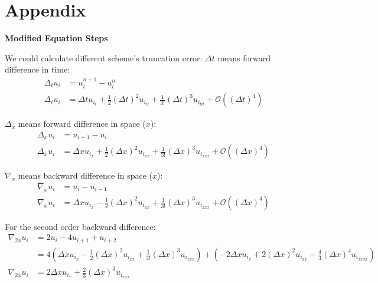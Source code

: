 \documentclass[12pt]{article}
\begin{document}
\newpage
\section*{Appendix}
\begin{scriptsize}

    \textbf{Modified Equation Steps}

    We could calculate different scheme's truncation error:
    \(\Delta t\) means forward difference in time:
    \begin{align*}
        \Delta_t u_i &= u_i^{n+1} - u_i^n \\
        \Delta_t u_i &= \Delta t u_{i_t} + \frac{1}{2}(\Delta t)^2 u_{i_{tt}} + \frac{1}{3!}(\Delta t)^3 u_{i_{ttt}} + \mathcal{O}((\Delta t)^4)
    \end{align*}
    
    \(\Delta_x\) means forward difference in space (\(x\)):
    \begin{align*}
        \Delta_x u_i &= u_{i+1} - u_i \\
        \Delta_x u_i &= \Delta x u_{i_x} + \frac{1}{2}(\Delta x)^2 u_{i_{xx}} + \frac{1}{3!}(\Delta x)^3 u_{i_{xxx}} + \mathcal{O}((\Delta x)^4)
    \end{align*}
    
    \(\nabla_x\) means backward difference in space (\(x\)):
    \begin{align*}
        \nabla_x u_i &= u_i - u_{i-1} \\
        \nabla_x u_i &= \Delta x u_{i_x} - \frac{1}{2}(\Delta x)^2 u_{i_{xx}} + \frac{1}{3!}(\Delta x)^3 u_{i_{xxx}} + \mathcal{O}((\Delta x)^4)
    \end{align*}
    
    For the second order backward difference:
    \begin{align*}
        \nabla_{2x} u_i &= 2u_i - 4u_{i+1} + u_{i+2} \\
        &= 4(\Delta x u_{i_x} - \frac{1}{2}(\Delta x)^2 u_{i_{xx}} + \frac{1}{3!}(\Delta x)^3 u_{i_{xxx}}) + (-2\Delta x u_{i_x} + 2(\Delta x)^2 u_{i_{xx}} - \frac{4}{3}(\Delta x)^4 u_{i_{xxxx}}) \\
        \nabla_{2x} u_i &= 2 \Delta x u_{i_x} + \frac{2}{3}(\Delta x)^3 u_{i_{xxx}}
    \end{align*}
    

\end{scriptsize}
\end{document}
